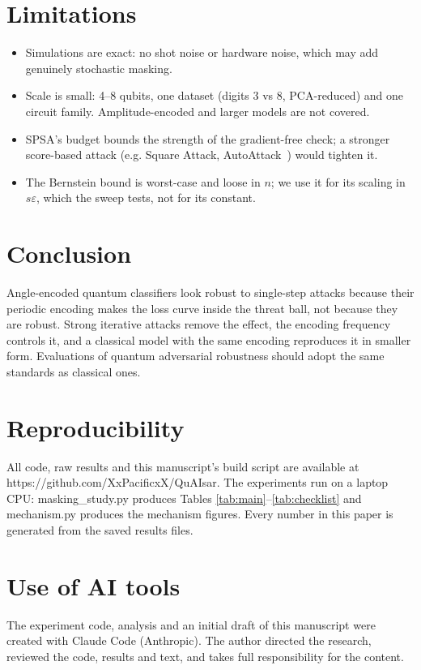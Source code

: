 \documentclass[11pt]{article}
\begin{document}
\section{Limitations}\label{sec:limits}
\begin{itemize}
\item Simulations are exact: no shot noise or hardware noise, which may add genuinely stochastic masking.
\item Scale is small: 4--8 qubits, one dataset (digits 3 vs 8, PCA-reduced) and one circuit family. Amplitude-encoded and larger models are not covered.
\item SPSA's budget bounds the strength of the gradient-free check; a stronger score-based attack (e.g. Square Attack, AutoAttack~\cite{croce2020}) would tighten it.
\item The Bernstein bound is worst-case and loose in $n$; we use it for its scaling in $s\varepsilon$, which the sweep tests, not for its constant.
\end{itemize}
\section{Conclusion}\label{sec:conclusion}
Angle-encoded quantum classifiers look robust to single-step attacks because their periodic encoding makes the loss curve inside the threat ball, not because they are robust. Strong iterative attacks remove the effect, the encoding frequency controls it, and a classical model with the same encoding reproduces it in smaller form. Evaluations of quantum adversarial robustness should adopt the same standards as classical ones.

\section*{Reproducibility}
All code, raw results and this manuscript's build script are available at https://github.com/XxPacificxX/QuAIsar. The experiments run on a laptop CPU: masking\_study.py produces Tables \ref{tab:main}--\ref{tab:checklist} and mechanism.py produces the mechanism figures. Every number in this paper is generated from the saved results files.

\section*{Use of AI tools}
The experiment code, analysis and an initial draft of this manuscript were created with Claude Code (Anthropic). The author directed the research, reviewed the code, results and text, and takes full responsibility for the content.
\end{document}
